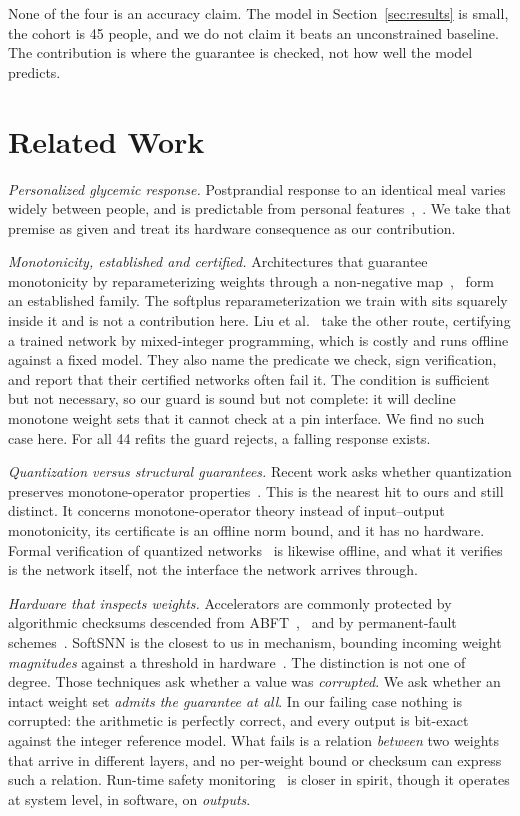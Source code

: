 \documentclass[conference]{IEEEtran}
\begin{document}
None of the four is an accuracy claim. The model in Section~\ref{sec:results}
is small, the cohort is 45 people, and we do not claim it beats an
unconstrained baseline. The contribution is where the guarantee is checked, not
how well the model predicts.

\section{Related Work}

\textit{Personalized glycemic response.} Postprandial response to an identical
meal varies widely between people, and is predictable from personal
features~\cite{zeevi2015},~\cite{berry2020}. We take that premise as given and
treat its hardware consequence as our contribution.

\textit{Monotonicity, established and certified.} Architectures that guarantee
monotonicity by reparameterizing weights through a non-negative
map~\cite{runje2023},~\cite{scalable2024} form an established family. The
softplus reparameterization we train with sits squarely inside it and is not a
contribution here. Liu et al.~\cite{liu2020} take the other route, certifying a
trained network by mixed-integer programming, which is costly and runs offline
against a fixed model. They also name the predicate we check, sign
verification, and report that their certified networks often fail it. The
condition is sufficient but not necessary, so our guard is sound but not
complete: it will decline monotone weight sets that it cannot check at a pin
interface. We find no such case here. For all 44 refits the guard rejects, a
falling response exists.

\textit{Quantization versus structural guarantees.} Recent work asks whether
quantization preserves monotone-operator properties~\cite{quantmon2026}. This
is the nearest hit to ours and still distinct. It concerns monotone-operator
theory instead of input--output monotonicity, its certificate is an offline
norm bound, and it has no hardware. Formal verification of quantized
networks~\cite{qvip2022} is likewise offline, and what it verifies is the
network itself, not the interface the network arrives through.

\textit{Hardware that inspects weights.} Accelerators are commonly protected by
algorithmic checksums descended from ABFT~\cite{huang1984},~\cite{ozen2020} and
by permanent-fault schemes~\cite{zhang2018}. SoftSNN is the closest to us in
mechanism, bounding incoming weight \emph{magnitudes} against a threshold in
hardware~\cite{putra2022}. The distinction is not one of degree. Those
techniques ask whether a value was \emph{corrupted}. We ask whether an intact
weight set \emph{admits the guarantee at all}. In our failing case nothing is
corrupted: the arithmetic is perfectly correct, and every output is bit-exact
against the integer reference model. What fails is a relation \emph{between}
two weights that arrive in different layers, and no per-weight bound or
checksum can express such a relation. Run-time safety
monitoring~\cite{xiang2022} is closer in spirit, though it operates at system
level, in software, on \emph{outputs}.
\end{document}
